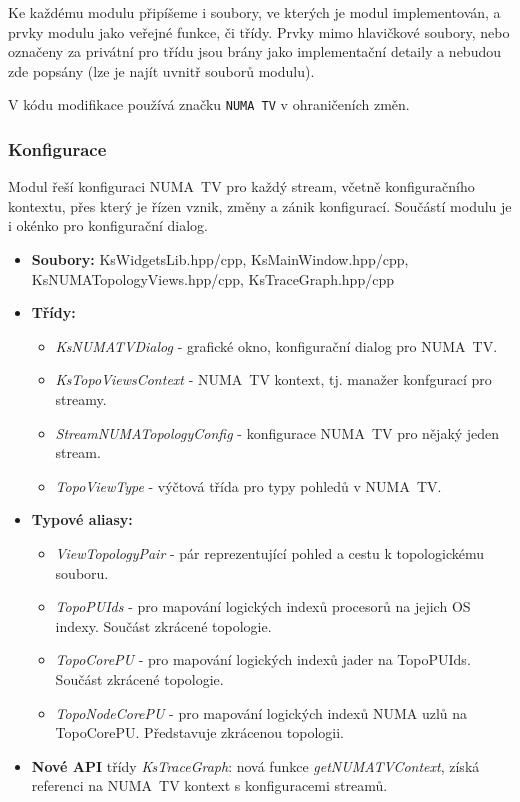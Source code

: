 Ke každému modulu připíšeme i soubory, ve kterých je modul implementován, a prvky modulu jako veřejné funkce, či třídy. Prvky mimo hlavičkové soubory, nebo označeny za privátní pro třídu jsou brány jako implementační detaily a nebudou zde popsány (lze je najít uvnitř souborů modulu).

V kódu modifikace používá značku \texttt{NUMA~TV} v ohraničeních změn.

\subsubsection*{Konfigurace}
Modul řeší konfiguraci NUMA~TV pro každý stream, včetně konfiguračního kontextu, přes který je řízen vznik, změny a zánik konfigurací. Součástí modulu je i okénko pro konfigurační dialog.

\begin{itemize}
    \item \textbf{Soubory:} KsWidgetsLib.hpp/cpp, KsMainWindow.hpp/cpp, KsNUMATopologyViews.hpp/cpp, KsTraceGraph.hpp/cpp
    \item \textbf{Třídy:}
    \begin{itemize}
        \item \emph{KsNUMATVDialog} - grafické okno, konfigurační dialog pro NUMA~TV.
        \item \emph{KsTopoViewsContext} - NUMA~TV kontext, tj. manažer konfgurací pro streamy.
        \item \emph{StreamNUMATopologyConfig} - konfigurace NUMA~TV pro nějaký jeden stream.
        \item \emph{TopoViewType} - výčtová třída pro typy pohledů v NUMA~TV.
    \end{itemize}
    \item \textbf{Typové aliasy:}
    \begin{itemize}
        \item \emph{ViewTopologyPair} - pár reprezentující pohled a cestu k topologickému souboru.
        \item \emph{TopoPUIds} - pro mapování logických indexů procesorů na jejich OS indexy. Součást zkrácené topologie.
        \item \emph{TopoCorePU} - pro mapování logických indexů jader na TopoPUIds. Součást zkrácené topologie.
        \item \emph{TopoNodeCorePU} - pro mapování logických indexů NUMA uzlů na TopoCorePU. Představuje zkrácenou topologii.
    \end{itemize}
    \item \textbf{Nové API} třídy \emph{KsTraceGraph}: nová funkce \emph{getNUMATVContext}, získá referenci na NUMA~TV kontext s konfiguracemi streamů.
\end{itemize}

